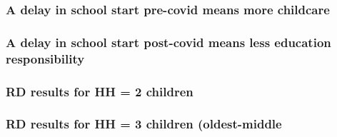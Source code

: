 \documentclass{beamer}
\begin{document}
\begin{frame}
    \label{update_scott}
    \frametitle{A delay in school start pre-covid means more childcare}
 {
    }
\end{frame}



\begin{frame}
    \label{update_scott}
    \frametitle{A delay in school start post-covid means less education responsibility}
 {
    }
\end{frame}


\begin{frame}
    \frametitle{RD results for HH = 2 children}
    
\end{frame}

\begin{frame}
    \frametitle{RD results for HH = 3 children (oldest-middle}
    
\end{frame}
\end{document}
